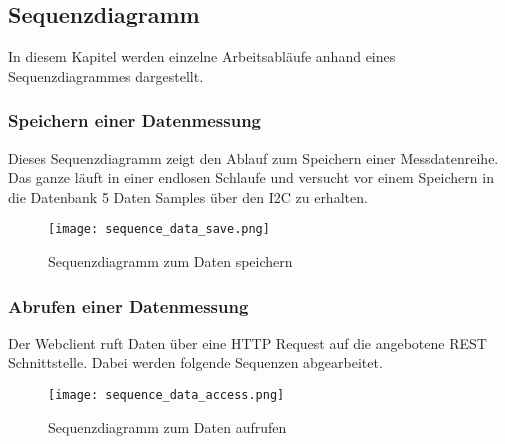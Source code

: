 \subsection{Sequenzdiagramm}
In diesem Kapitel werden einzelne Arbeitsabläufe anhand eines Sequenzdiagrammes dargestellt.
	\subsubsection{Speichern einer Datenmessung}
    Dieses Sequenzdiagramm zeigt den Ablauf zum Speichern einer Messdatenreihe. Das ganze läuft in einer endlosen Schlaufe und versucht vor einem Speichern in die Datenbank 5 Daten Samples über den I2C zu erhalten.
    \begin{figure}[H]
        \centering
        \texttt{[image: sequence\_data\_save.png]}
        \caption{Sequenzdiagramm zum Daten speichern}
    \end{figure}

    \clearpage
    \subsubsection{Abrufen einer Datenmessung}
    Der Webclient ruft Daten über eine HTTP Request auf die angebotene REST Schnittstelle. Dabei werden folgende Sequenzen abgearbeitet.
    \begin{figure}[H]
        \centering
        \texttt{[image: sequence\_data\_access.png]}
        \caption{Sequenzdiagramm zum Daten aufrufen}
    \end{figure}
